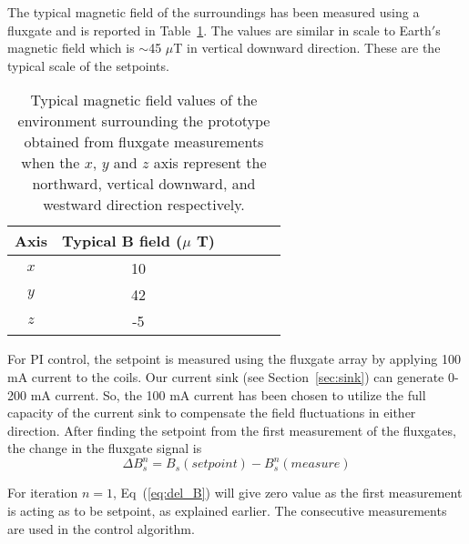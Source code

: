 The typical magnetic field of the surroundings has been measured using a fluxgate and is reported in Table~\ref{table:Benvironment}. The values are similar in scale to Earth$'$s magnetic field which is $\sim$45 $\mu$T in vertical downward direction. These are the typical scale of the setpoints.

\begin{table} [htb!]
    \centering
    \begin{tabular} { |c|c|c|c|c|c|} 
        \hline
        Axis & \makecell{Typical B field \\($\mu$ T)}\\
        \hline\hline
        $x$ & 10 \\ 
        \hline
        $y$ & 42 \\ 
        \hline
        $z$ & -5 \\ 
        \hline
    \end{tabular}
    \caption[Typical magnetic fields surrounding the prototype]{Typical magnetic field values of the environment surrounding the prototype obtained from fluxgate measurements when the $x$, $y$ and $z$ axis represent the northward, vertical downward, and westward direction respectively. }\label{table:Benvironment}
\end{table}

For PI control, the setpoint is measured using the fluxgate array by applying 100 mA current to the coils. Our current sink (see Section~\ref{sec:sink}) can generate 0-200 mA current. So, the 100 mA current has been chosen to utilize the full capacity of the current sink to compensate the field fluctuations in either direction. After finding the setpoint from the first measurement of the fluxgates, the change in the fluxgate signal is
\begin{equation}\label{eq:del_B}
    \Delta B_s^n = B_s(setpoint) - B_s^n(measure)
\end{equation}

For iteration $n=1$, Eq~(\ref{eq:del_B}) will give zero value as the first measurement is acting as to be setpoint, as explained earlier. The consecutive measurements are used in the control algorithm. 


